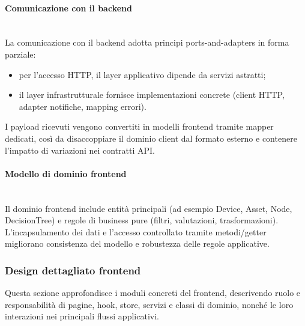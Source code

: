 \documentclass[a4paper,12pt]{article}
\begin{document}
            \paragraph{Comunicazione con il backend}\mbox{}\\
            La comunicazione con il backend adotta principi ports-and-adapters in forma parziale:
            \begin{itemize}
                \item per l'accesso HTTP, il layer applicativo dipende da servizi astratti;
                \item il layer infrastrutturale fornisce implementazioni concrete (client HTTP, adapter notifiche, mapping errori).
            \end{itemize}
            I payload ricevuti vengono convertiti in modelli frontend tramite mapper dedicati, così da disaccoppiare il dominio client dal formato esterno e contenere l'impatto di variazioni nei contratti API.
            
            \paragraph{Modello di dominio frontend}\mbox{}\\
            Il dominio frontend include entità principali (ad esempio Device, Asset, Node, DecisionTree) e regole di business pure (filtri, valutazioni, trasformazioni).  
            L'incapsulamento dei dati e l'accesso controllato tramite metodi/getter migliorano consistenza del modello e robustezza delle regole applicative.

            
        \subsubsection{Design dettagliato frontend}
            Questa sezione approfondisce i moduli concreti del frontend, descrivendo ruolo e responsabilità di pagine, hook, store, servizi e classi di dominio, nonché le loro interazioni nei principali flussi applicativi.
\end{document}
